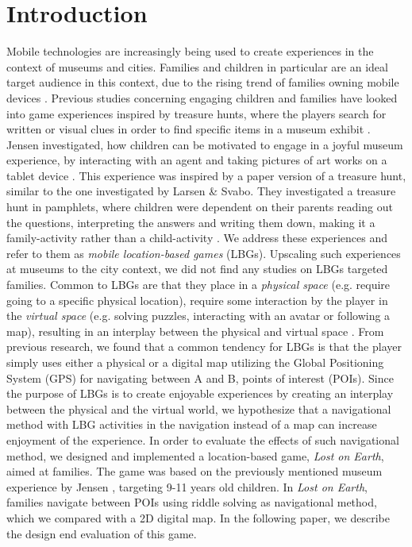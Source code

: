 \section{Introduction}
Mobile technologies are increasingly being used to create experiences in the context of museums and cities. Families and children in particular are an ideal target audience in this context, due to the rising trend of families owning mobile devices \cite{Statistik}. Previous studies concerning engaging children and families have looked into game experiences inspired by treasure hunts, where the players search for written or visual clues in order to find specific items in a museum exhibit \cite{Lynge}\cite{larsen2014tourist}. Jensen investigated, how children can be motivated to engage in a joyful museum experience, by interacting with an agent and taking pictures of art works on a tablet device \cite{Lynge}. This experience was inspired by a paper version of a treasure hunt, similar to the one investigated by Larsen \& Svabo. They investigated a treasure hunt in pamphlets, where children were dependent on their parents reading out the questions, interpreting the answers and writing them down, making it a family-activity rather than a child-activity \cite{larsen2014tourist}. We address these experiences and refer to them as \textit{mobile location-based games} (LBGs). Upscaling such experiences at museums to the city context, we did not find any studies on LBGs targeted families. Common to LBGs are that they place in a \textit{physical space} (e.g. require going to a specific physical location), require some interaction by the player in the \textit{virtual space} (e.g. solving puzzles, interacting with an avatar or following a map), resulting in an interplay between the physical and virtual space \cite{LBG_Review}. %
From previous research, we found that a common tendency for LBGs is that the player simply uses either a physical or a digital map utilizing the Global Positioning System (GPS) for navigating between A and B, points of interest (POIs). Since the purpose of LBGs is to create enjoyable experiences by creating an interplay between the physical and the virtual world, we hypothesize that a navigational method with LBG activities in the navigation instead of a map can increase enjoyment of the experience. In order to evaluate the effects of such navigational method, we designed and implemented a location-based game, \textit{Lost on Earth}, aimed at families. The game was based on the previously mentioned museum experience by Jensen \cite{Lynge}, targeting 9-11 years old children. In \textit{Lost on Earth}, families navigate between POIs using riddle solving as navigational method, which we compared with a 2D digital map. In the following paper, we describe the design end evaluation of this game. 

